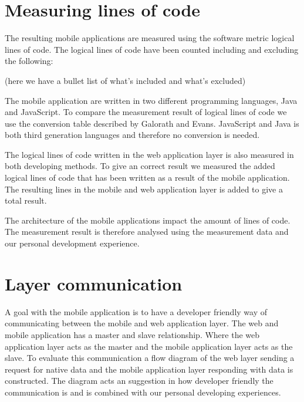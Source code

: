 \section{Measuring lines of code}
The resulting mobile applications are measured using the software metric logical lines of code. The logical lines of code have been counted including and excluding the following:

(here we have a bullet list of what's included and what's excluded)

The mobile application are written in two different programming languages, Java and JavaScript. To compare the measurement result of logical lines of code we use the conversion table described by Galorath and Evans\cite[p.~163]{galorath2006}. JavaScript and Java is both third generation languages and therefore no conversion is needed. 

The logical lines of code written in the web application layer is also measured in both developing methods. To give an correct result we measured the added logical lines of code that has been written as a result of the mobile application. The resulting lines in the mobile and web application layer is added to give a total result. 

The architecture of the mobile applications impact the amount of lines of code. The measurement result is therefore analysed using the measurement data and our personal development experience.

\section{Layer communication}
A goal with the mobile application is to have a developer friendly way of communicating between the mobile and web application layer. The web and mobile application has a master and slave relationship. Where the web application layer acts as the master and the mobile application layer acts as the slave. To evaluate this communication a flow diagram of the web layer sending a request for native data and the mobile application layer responding with data is constructed. The diagram acts an suggestion in how developer friendly the communication is and is combined with our personal developing experiences.